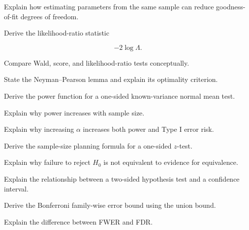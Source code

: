 \begin{exercise}[3]
Explain how estimating parameters from the same sample can reduce
goodness-of-fit degrees of freedom.
\end{exercise}

\begin{exercise}[3]
Derive the likelihood-ratio statistic

\[
-2\log\Lambda.
\]
\end{exercise}

\begin{exercise}[3]
Compare Wald, score, and likelihood-ratio tests conceptually.
\end{exercise}

\begin{exercise}[3]
State the Neyman--Pearson lemma and explain its optimality criterion.
\end{exercise}

\begin{exercise}[3]
Derive the power function for a one-sided known-variance normal mean
test.
\end{exercise}

\begin{exercise}[3]
Explain why power increases with sample size.
\end{exercise}

\begin{exercise}[3]
Explain why increasing \(\alpha\) increases both power and Type I error
risk.
\end{exercise}

\begin{exercise}[3]
Derive the sample-size planning formula for a one-sided \(z\)-test.
\end{exercise}

\begin{exercise}[3]
Explain why failure to reject \(H_0\) is not equivalent to evidence for
equivalence.
\end{exercise}

\begin{exercise}[3]
Explain the relationship between a two-sided hypothesis test and a
confidence interval.
\end{exercise}

\begin{exercise}[3]
Derive the Bonferroni family-wise error bound using the union bound.
\end{exercise}

\begin{exercise}[3]
Explain the difference between FWER and FDR.
\end{exercise}

